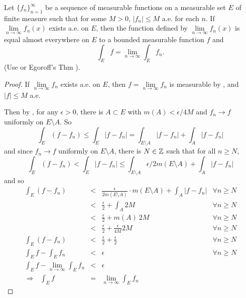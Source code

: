 \begin{pblm}\label{p:intofsequenceeqlimint}%
	Let $\{f_n\}_{n=1}^\infty$ be a sequence of measurable functions on a measurable set $E$ of 
	finite measure such that for some $M > 0$, $|f_n|\le M$ a.e. for each $n$. If 
	$\lim\limits_{n\to\infty}f_n(x)$ exists a.e. on $E$, then the function defined by 
	$\lim\limits_{n\to\infty}f_n(x)$ is equal almost everywhere on $E$ to a bounded measurable 
	function $f$ and 
	\begin{equation*}
		\int_E f = \lim\limits_{n\to\infty}\int_E f_n.
	\end{equation*}
	(Use  or Egoroff's Thm ). 
\begin{proof}
	If $\lim\limits_{n\to\infty}f_n$ exists a.e. on $E$, then $f = \lim\limits_{n\to\infty} f_n$ 
	is measurable by , and $|f| \le M$ a.e. 

	Then by , for any $\epsilon > 0$, there is $A \subset E$ with $m(A) < \epsilon/4M$ and 
	$f_n \rightarrow f$ uniformly on $E \setminus A$. So 
	\begin{equation*}
		\int_E (f - f_n) \le \int_E |f - f_n| = \int_{E \setminus A} |f-f_n| + \int_A|f-f_n|
	\end{equation*}
	and since $f_n\rightarrow f$ uniformly on $E \setminus A$, there is $N \in \mathbb{Z}$ such that 
	for all $n \ge N$, 
	\begin{equation*}
		\int_E (f - f_n) < \int_E|f-f_n|\le \int_{E \setminus A} \epsilon/2m(E\setminus A) + \int_A|f-f_n|
	\end{equation*}
	and so 
	\begin{equation*}
	\begin{array}{rclr}
		 \int_E(f-f_n) & < & \frac{\epsilon}{2m(E\setminus A)} \cdot m(E\setminus A) + \int_A|f-f_n| & \forall n \ge N\\
		 & < & \frac{\epsilon}{2} + \int_A 2M & \forall n \ge N\\
		 & < & \frac{\epsilon}{2} + m(A) ~ 2M & \forall n \ge N\\
		 & < & \frac{\epsilon}{2} + \frac{\epsilon}{4M} 2M & \forall n \ge N\\
		 \int_E(f-f_n) & < & \frac{\epsilon}{2} + \frac{\epsilon}{2} & \forall n \ge N\\
		 \int_Ef-\int_Ef_n & < & \epsilon  & \forall n \ge N\\
		 \int_Ef-\lim\limits_{n\to\infty}\int_Ef_n & < & \epsilon  & \\
	\Rightarrow~~~  \int_E f & = & \lim\limits_{n\to\infty}\int_Ef_n
	\end{array}
	\end{equation*}
\end{proof}
\end{pblm}

